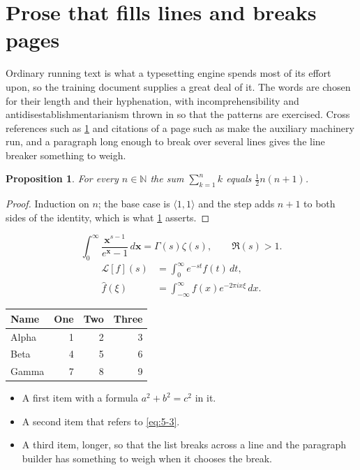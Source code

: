 \documentclass[11pt,a4paper]{report}
\theoremstyle{plain}
\newtheorem{proposition}{Proposition}[chapter]
\newcommand{\vecn}[1]{\mathbf{#1}}
\newcommand{\pairs}[2]{\langle #1,#2\rangle}
\begin{document}
\section{Prose that fills lines and breaks pages}
\label{sec:prose5-3}
Ordinary running text is what a typesetting engine spends most of its effort
upon, so the training document supplies a great deal of it. The words are
chosen for their length and their hyphenation, with incomprehensibility and
antidisestablishmentarianism thrown in so that the patterns are exercised.
Cross references such as \cref{sec:prose5-3} and citations of a page such
as \pageref{sec:prose5-3} make the auxiliary machinery run, and a
paragraph long enough to break over several lines gives the line breaker
something to weigh.
\begin{proposition}\label{prop:5-3}
For every $n\in\mathbb{N}$ the sum $\sum_{k=1}^{n}k$ equals
$\tfrac{1}{2}n(n+1)$.
\end{proposition}
\begin{proof}
Induction on $n$; the base case is $\pairs{1}{1}$ and the step adds $n+1$ to
both sides of the identity, which is what \cref{prop:5-3} asserts.
\end{proof}
\begin{equation}\label{eq:5-3}
  \int_{0}^{\infty}\frac{\vecn{x}^{s-1}}{e^{\vecn{x}}-1}\,d\vecn{x}
    = \Gamma(s)\zeta(s),\qquad \Re(s)>1 .
\end{equation}
\begin{align}
  \mathcal{L}[f](s) &= \int_{0}^{\infty} e^{-st} f(t)\,dt, \\
  \widehat{f}(\xi)  &= \int_{-\infty}^{\infty} f(x) e^{-2\pi i x\xi}\,dx .
\end{align}
\par\noindent\begin{center}
\begin{tabular}{lrrr}
\hline
Name & One & Two & Three \\
\hline
Alpha & 1 & 2 & 3 \\
Beta & 4 & 5 & 6 \\
Gamma & 7 & 8 & 9 \\
\hline
\end{tabular}
\end{center}
\begin{itemize}
  \item A first item with a formula $a^2+b^2=c^2$ in it.
  \item A second item that refers to \eqref{eq:5-3}.
  \item A third item, longer, so that the list breaks across a line and the
    paragraph builder has something to weigh when it chooses the break.
\end{itemize}
\end{document}
